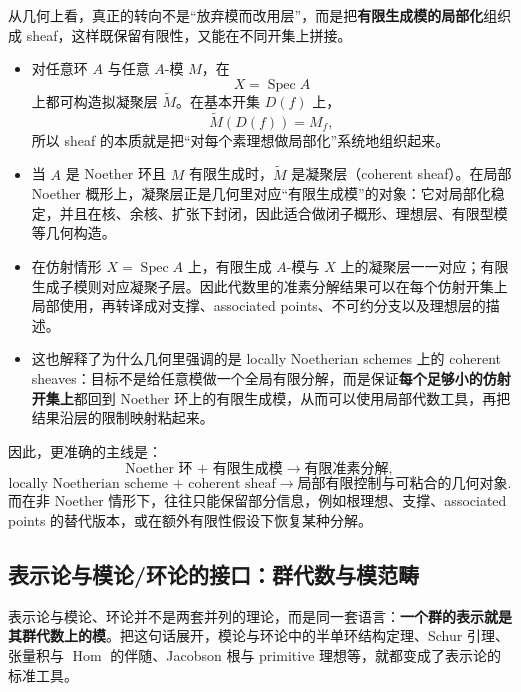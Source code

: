 \documentclass[a4paper]{ctexart}
\theoremstyle{definition}
\theoremstyle{analysis}
\theoremstyle{plain}
\begin{document}
\medskip

从几何上看，真正的转向不是“放弃模而改用层”，而是把\textbf{有限生成模的局部化}组织成 sheaf，这样既保留有限性，又能在不同开集上拼接。

\begin{itemize}
  \item 对任意环 \(A\) 与任意 \(A\)-模 \(M\)，在
  \[
    X=\operatorname{Spec}A
  \]
  上都可构造拟凝聚层 \(\widetilde M\)。在基本开集 \(D(f)\) 上，
  \[
    \widetilde M(D(f))=M_f,
  \]
  所以 sheaf 的本质就是把“对每个素理想做局部化”系统地组织起来。

  \item 当 \(A\) 是 Noether 环且 \(M\) 有限生成时，\(\widetilde M\) 是凝聚层（coherent sheaf）。在局部 Noether 概形上，凝聚层正是几何里对应“有限生成模”的对象：它对局部化稳定，并且在核、余核、扩张下封闭，因此适合做闭子概形、理想层、有限型模等几何构造。

  \item 在仿射情形 \(X=\operatorname{Spec}A\) 上，有限生成 \(A\)-模与 \(X\) 上的凝聚层一一对应；有限生成子模则对应凝聚子层。因此代数里的准素分解结果可以在每个仿射开集上局部使用，再转译成对支撑、associated points、不可约分支以及理想层的描述。

  \item 这也解释了为什么几何里强调的是 locally Noetherian schemes 上的 coherent sheaves：目标不是给任意模做一个全局有限分解，而是保证\textbf{每个足够小的仿射开集上}都回到 Noether 环上的有限生成模，从而可以使用局部代数工具，再把结果沿层的限制映射粘起来。
\end{itemize}

因此，更准确的主线是：
\[
  \text{Noether 环 + 有限生成模}
  \longrightarrow
  \text{有限准素分解},
\]
\[
  \text{locally Noetherian scheme + coherent sheaf}
  \longrightarrow
  \text{局部有限控制与可粘合的几何对象}.
\]
而在非 Noether 情形下，往往只能保留部分信息，例如根理想、支撑、associated points 的替代版本，或在额外有限性假设下恢复某种分解。
\subsection{表示论与模论/环论的接口：群代数与模范畴}\label{subsec:topic-representation-module-bridge}

表示论与模论、环论并不是两套并列的理论，而是同一套语言：\textbf{一个群的表示就是其群代数上的模}。把这句话展开，模论与环论中的半单环结构定理、Schur 引理、张量积与 \(\operatorname{Hom}\) 的伴随、Jacobson 根与 primitive 理想等，就都变成了表示论的标准工具。
\end{document}
